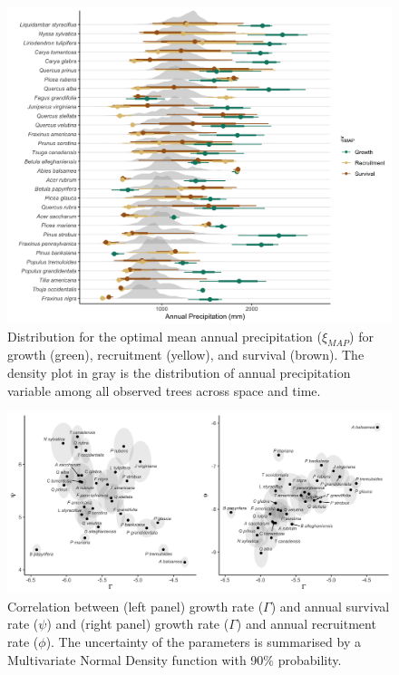 \hypertarget{fig:figsupp7_ch2}{%
\begin{figure}
\centering
\includegraphics{manuscript/figs/fig-mapDist-1.png}
\caption[{Distribution for the optimal mean annual precipitation
(\(\xi_{MAP}\)) for growth (green), recruitment (yellow), and survival
(brown).}]{Distribution for the optimal mean annual precipitation
(\(\xi_{MAP}\)) for growth (green), recruitment (yellow), and survival
(brown). The density plot in gray is the distribution of annual
precipitation variable among all observed trees across space and time.}
\label{fig:figsupp7_ch2}
\end{figure}
}

\newpage

\hypertarget{fig:figsupp8_ch2}{%
\begin{figure}
\centering
\includegraphics{manuscript/figs/intercept_corr.png}
\caption[{Correlation between (left panel) growth rate (\(\Gamma\)) and
annual survival rate (\(\psi\)) and (right panel) growth rate
(\(\Gamma\)) and annual recruitment rate (\(\phi\)).}]{Correlation
between (left panel) growth rate (\(\Gamma\)) and annual survival rate
(\(\psi\)) and (right panel) growth rate (\(\Gamma\)) and annual
recruitment rate (\(\phi\)). The uncertainty of the parameters is
summarised by a Multivariate Normal Density function with 90\%
probability.}
\label{fig:figsupp8_ch2}
\end{figure}
}

